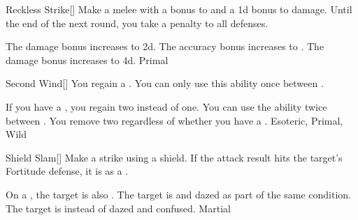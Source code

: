 \lowercase{\hypertarget{maneuver:Reckless Strike}{}}\label{maneuver:Reckless Strike}
\hypertarget{maneuver:Reckless Strike}{}
\begin{freeability}{Reckless Strike}[]
Make a melee  with a  bonus to  and a \plus1d bonus to damage.
Until the end of the next round, you take a  penalty to all defenses.

\rankline
{} The damage bonus increases to \plus2d.
 The accuracy bonus increases to .
 The damage bonus increases to \plus4d.
 Primal
\end{freeability}
\vspace{0.25em}



\lowercase{\hypertarget{maneuver:Second Wind}{}}\label{maneuver:Second Wind}
\hypertarget{maneuver:Second Wind}{}
\begin{freeability}{Second Wind}[]
You regain a .
You can only use this ability once between .

\rankline
{} If you have a , you regain two  instead of one.
 You can use the ability twice between .
 You remove two  regardless of whether you have a .
 Esoteric, Primal, Wild
\end{freeability}
\vspace{0.25em}



\lowercase{\hypertarget{maneuver:Shield Slam}{}}\label{maneuver:Shield Slam}
\hypertarget{maneuver:Shield Slam}{}
\begin{freeability}{Shield Slam}[]
Make a strike using a shield.
If the attack result hits the target's Fortitude defense,
it is  as a .

\rankline
{} On a , the target is also .
 The target is  and dazed as part of the same condition.
 The target is  instead of dazed and confused.
 Martial
\end{freeability}
\vspace{0.25em}



